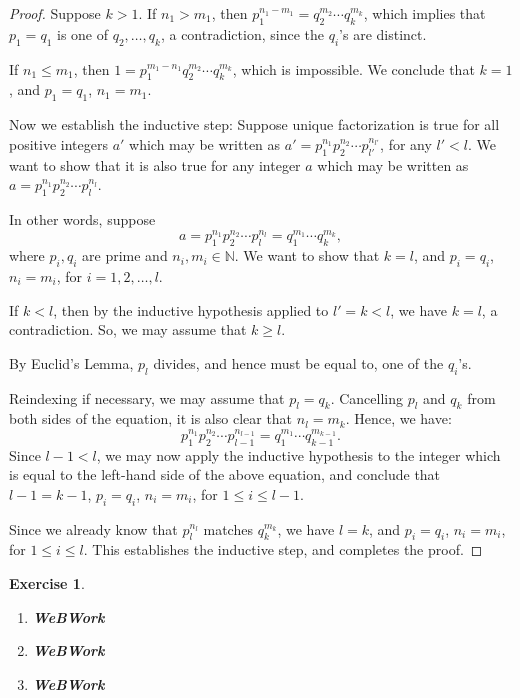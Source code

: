 \documentclass[a4paper,12pt]{report}
\newcounter{statement}
\numberwithin{statement}{chapter}
\newtheorem{ex}[statement]{\bf Exercise}
\numberwithin{equation}{chapter}
\numberwithin{section}{chapter}
\numberwithin{subsection}{section}
\begin{document}
\begin{proof}
Suppose $k > 1$. If $n_1 > m_1$, then $p_1^{n_1 - m_1} = q_2^{m_2}\cdots q_k^{m_k}$,
which implies that $p_1 = q_1$ is one of $q_2,\ldots, q_k$, a contradiction, since the $q_i$'s are distinct.




If $n_1 \leq m_1$, then $1 = p_1^{m_1 - n_1}q_2^{m_2}\cdots q_k^{m_k}$,
which is impossible.
We conclude that $k = 1$, and $p_1 = q_1$, $n_1 = m_1$.




Now we establish the inductive step: Suppose unique factorization is true for all positive integers $a'$
which may be written as $a' = p_1^{n_1}p_2^{n_2}\cdots p_{l'}^{n_{l'}}$,
for any $l' < l$.
We want to show that it is also true for any integer $a$
which may be written as $a = p_1^{n_1}p_2^{n_2}\cdots p_{l}^{n_{l}}$.




In other words, suppose
\[
a = p_1^{n_1}p_2^{n_2}\cdots p_{l}^{n_{l}} = q_1^{m_1}\cdots q_k^{m_k},
\]
where $p_i, q_i$ are prime and $n_i, m_i \in \mathbb{N}$. We want to show that $k = l$, and $p_i = q_i$,
$n_i = m_i$, for $i = 1, 2, \ldots, l$.




If $k < l$, then by the inductive hypothesis applied to $l' = k < l$, we have $k = l$,
a contradiction.
So, we may assume that $k \geq l$.




By Euclid's Lemma, $p_l$ divides, and hence must be equal to, one of the
$q_i$'s.




Reindexing if necessary, we may assume that $p_l = q_k$. Cancelling $p_l$ and $q_{k}$
from both sides of the equation, it is also clear that $n_l = m_{k}$.
Hence, we have:
\[
p_1^{n_1}p_2^{n_2}\cdots p_{l-1}^{n_{l-1}} = q_1^{m_1}\cdots q_{k-1}^{m_{k -1}}.
\]
Since $l - 1 < l$, we may now apply the inductive hypothesis to the integer
which is equal to the left-hand side of the above equation,
and conclude that $l - 1 = k -1$, $p_i = q_i$, $n_i = m_i$, for $1\leq i \leq l - 1$.




Since we already know that $p_l^{n_l}$ matches $q_{k}^{m_{k}}$,
we have $l = k$, and $p_i = q_i$, $n_i = m_i$, for $1 \leq i \leq l$.
This establishes the inductive step, and completes the proof.


\end{proof}

\begin{ex}
\begin{enumerate}
\item 

{\bf WeBWork}

\item 

{\bf WeBWork}

\item 

{\bf WeBWork}
\end{enumerate}
\end{ex}
\end{document}
